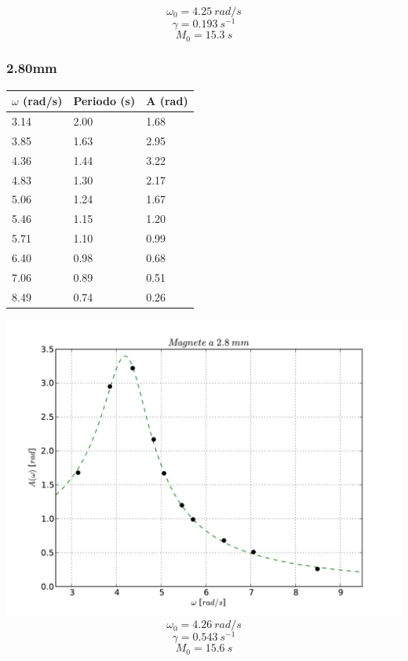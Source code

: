 \documentclass[a4paper,10pt]{report}
\begin{document}
$$ \omega_0 = 4.25\ rad/s $$
$$ \gamma = 0.193\ s^{-1}$$
$$ M_0 = 15.3\ s$$

\subsubsection{2.80mm}
\begin{center}
\begin{tabular}{l|l|l}
$\omega$ (rad/s) & Periodo (s) & A (rad) \\
\midrule
3.14 & 2.00 & 1.68 \\
3.85 & 1.63 & 2.95 \\
4.36 & 1.44 & 3.22 \\
4.83 & 1.30 & 2.17 \\
5.06 & 1.24 & 1.67 \\
5.46 & 1.15 & 1.20 \\
5.71 & 1.10 & 0.99 \\
6.40 & 0.98 & 0.68 \\
7.06 & 0.89 & 0.51 \\
8.49 & 0.74 & 0.26 \\
\midrule
\end{tabular}
\end{center}
\includegraphics[scale=0.75]{"../grafici/Magnetea28mm"}
\\


$$ \omega_0 = 4.26\ rad/s $$
$$ \gamma = 0.543\ s^{-1} $$
$$ M_0 = 15.6\ s$$
\end{document}
